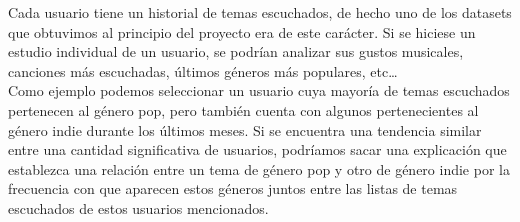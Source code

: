 Cada usuario tiene un historial de temas escuchados, de hecho uno de los datasets que obtuvimos al principio del proyecto era de este carácter. Si se hiciese un estudio individual de un usuario, se podrían analizar sus gustos musicales, canciones más escuchadas, últimos géneros más populares, etc…\\

Como ejemplo podemos seleccionar un usuario cuya mayoría de temas escuchados pertenecen al género pop, pero también cuenta con algunos pertenecientes al género indie durante los últimos meses. Si se encuentra una tendencia similar entre una cantidad significativa de usuarios, podríamos sacar una explicación que establezca una relación entre un tema de género pop y otro de género indie por la frecuencia con que aparecen estos géneros juntos entre las listas de temas escuchados de estos usuarios mencionados.\\
